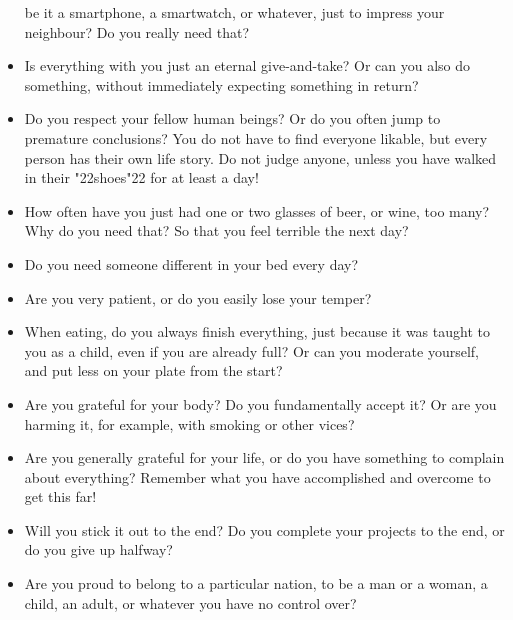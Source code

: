 \documentclass[12pt,a5paper]{article}
\newcommand{\q}[1]{\char"22{#1}\char"22 }
\begin{document}
\begin{itemize}[nosep]
					be it a smartphone,
					a smartwatch,
					or whatever,
					just to impress your neighbour?
					Do you really need that?
					\\
			\item	Is everything with you just an eternal give-and-take?
					Or can you also do something,
					without immediately expecting something in return?
					\\
			\item	Do you respect your fellow human beings?
					Or do you often jump to premature conclusions?
					You do not have to find everyone likable,
					but every person has their own life story.
					Do not judge anyone,
					unless you have walked in their \q{shoes} for at least a day!
					\\
			\item	How often have you just had one or two glasses of beer,
					or wine,
					too many?
					Why do you need that?
					So that you feel terrible the next day?
					\\
			\item	Do you need someone different in your bed every day?
					\\
			\item	Are you very patient,
					or do you easily lose your temper?
					\\
			\item	When eating,
					do you always finish everything,
					just because it was taught to you as a child,
					even if you are already full?
					Or can you moderate yourself,
					and put less on your plate from the start?
					\\
			\item	Are you grateful for your body?
					Do you fundamentally accept it?
					Or are you harming it,
					for example,
					with smoking or other vices?
					\\
			\item	Are you generally grateful for your life,
					or do you have something to complain about everything?
					Remember what you have accomplished and overcome to get this far!
					\\
			\item	Will you stick it out to the end?
					Do you complete your projects to the end,
					or do you give up halfway?
					\\
			\item	Are you proud to belong to a particular nation,
					to be a man or a woman,
					a child,
					an adult,
					or whatever you have no control over?

\end{itemize}
\end{document}
